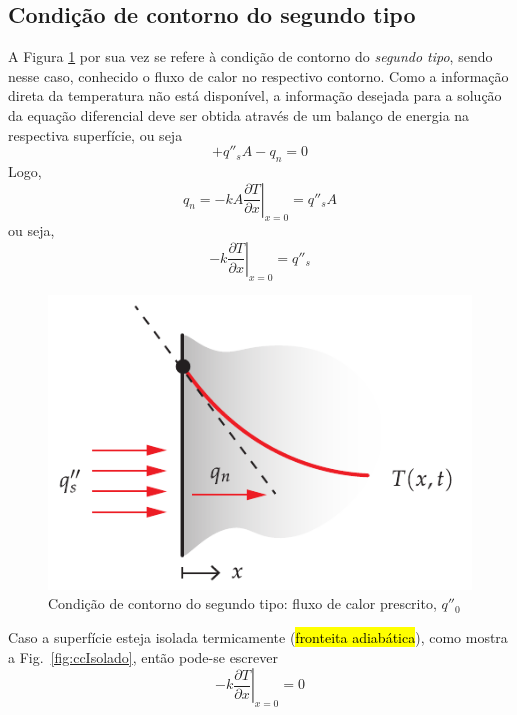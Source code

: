 \subsection{Condição de contorno do segundo tipo}
A Figura \ref{fig:ccFluxoCalor} por sua vez se refere à condição de contorno do \textit{segundo tipo}, sendo nesse caso, conhecido o fluxo de calor no respectivo contorno. Como a informação direta da temperatura não está disponível, a informação desejada para a solução da equação diferencial deve ser obtida através de um balanço de energia na respectiva superfície, ou seja
\begin{equation}\label{eq:q1}
+ q''_s A - q_n = 0  
\end{equation}
Logo,
\begin{equation}\label{eq:q2}
q_n = -k A\left.{\frac{\partial{T}}{\partial{x}}}\right|_{x=0} = q''_s A 
\end{equation}
ou seja,
\begin{equation}\label{eq:q3}
-k\left.{\frac{\partial{T}}{\partial{x}}}\right|_{x=0} = q''_s  
\end{equation}
\begin{figure}[H]
	\centering
	\includegraphics[scale=1]{figuras/cap1/ccFluxoConstante}
	\caption{Condição de contorno do segundo tipo: fluxo de calor prescrito, $q''_0$}
	\label{fig:ccFluxoCalor}
\end{figure}

Caso a superfície esteja isolada termicamente (\hl{fronteita adiabática}), como mostra a Fig.~\ref{fig:ccIsolado}, então pode-se escrever
\begin{equation}\label{eq:q4}
-k\left.{\frac{\partial{T}}{\partial{x}}}\right|_{x=0} =0
\end{equation}

